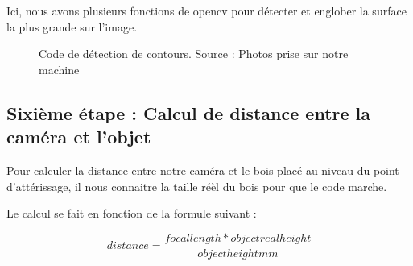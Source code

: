  Ici, nous avons plusieurs fonctions de opencv pour détecter et englober la surface la plus grande sur l'image.
 
 \begin{figure}[H]%
 	\center%
 	\setlength{\fboxsep}{5pt}%
 	\setlength{\fboxrule}{0.5pt}%
 	\caption[Code de détection de contours]{Code de détection de contours. Source : Photos prise sur notre machine}
 	\label{fig:Code de détection de contours}
 \end{figure}
 
 \subsection{Sixième étape : Calcul de distance entre la caméra et l'objet}
 
 Pour calculer la distance entre notre caméra et le bois placé au niveau du point d'attérissage, il nous connaitre la taille réèl du bois pour que le code marche. 
 
 Le calcul se fait en fonction de la formule suivant : 
 
 \[
  distance 
  =
 \frac{focallength * objectrealheight}{objectheightmm}
 \]

